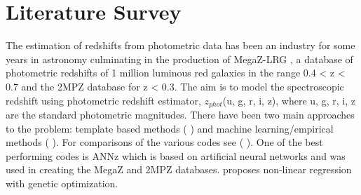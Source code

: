 \section{Literature Survey}
The estimation of redshifts from photometric data has been an industry for some years in astronomy culminating in the production of MegaZ-LRG \cite{collister2007megaz}, a database of photometric redshifts of 1 million luminous red galaxies in the range 0.4 < z < 0.7 and the 2MPZ database\cite{bilicki2013two} for z < 0.3. The aim is to model the spectroscopic redshift using photometric redshift estimator, $z_{phot}$(u, g, r, i, z), where {u, g, r, i, z} are the standard photometric magnitudes. There have been two main approaches to the problem: template based methods (\cite{benitez2000bayesian} \cite{brammer2008eazy} \cite{kotulla2009impact} \cite{dahlen2010detailed} \cite{bolzonella2000photometric} \cite{arnouts1999measuring} \cite{ilbert2006accurate} \cite{assef2008low} \cite{assef2010low} \cite{feldmann2006zurich}) and machine learning/empirical methods (\cite{collister2004annz} \cite{gerdes2010arborz} \cite{wolf2009bayesian} \cite{csabai2007multidimensional} \cite{carliles2010random} \cite{brescia2014catalogue} \cite{elliott2015overlooked}). For comparisons of the various codes see (\cite{abdalla2011comparison} \cite{hildebrandt2010phat} \cite{dahlen2013critical}). One of the best performing codes is ANNz\cite{collister2004annz} which is based on artificial neural networks and was used in creating the MegaZ and 2MPZ databases.\cite{hogan2015gaz} proposes non-linear regression with genetic optimization.
